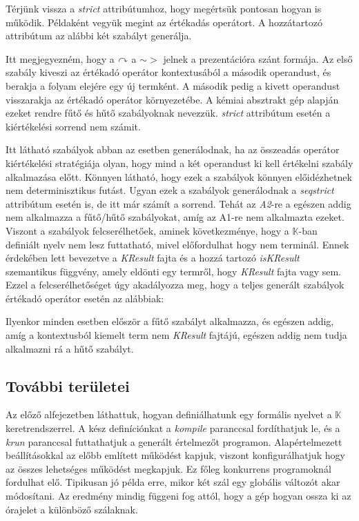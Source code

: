Térjünk vissza a \textit{strict} attribútumhoz, hogy megértsük pontosan hogyan is működik. Példaként vegyük megint az értékadás operátort. A hozzátartozó attribútum az alábbi két szabályt generálja.



Itt megjegyezném, hogy a $\curvearrowright$ a $\sim>$ jelnek a prezentációra szánt formája. Az első szabály kiveszi az értékadó operátor kontextusából a második operandust, és berakja a folyam elejére egy új termként. A második pedig a kivett operandust visszarakja az értékadó operátor környezetébe. A kémiai absztrakt gép alapján ezeket rendre fűtő és hűtő szabályoknak nevezzük. \textit{strict} attribútum esetén a kiértékelési sorrend nem számit.




Itt látható szabályok abban az esetben generálodnak, ha az összeadás operátor kiértékelési stratégiája olyan, hogy mind a két operandust ki kell értékelni szabály alkalmazása előtt. Könnyen látható, hogy ezek a szabályok könnyen előidézhetnek nem determinisztikus futást. Ugyan ezek a szabályok generálodnak a \textit{seqstrict} attribútum esetén is, de itt már számít a sorrend. Tehát az \textit{A2}-re a egészen addig nem alkalmazza a fűtő/hűtő szabályokat, amíg az A1-re nem alkalmazta ezeket. Viszont a szabályok felcserélhetőek, aminek következménye, hogy a $\mathbb{K}$-ban definiált nyelv nem lesz futtatható, mivel előfordulhat hogy nem terminál. Ennek érdekében lett bevezetve a \textit{KResult} fajta és a hozzá tartozó \textit{isKResult} szemantikus függvény, amely eldönti egy termről, hogy \textit{KResult} fajta vagy sem. Ezzel a felcserélhetőséget úgy akadályozza meg, hogy a teljes generált szabályok értékadó operátor esetén az alábbiak:



Ilyenkor minden esetben először a fűtő szabályt alkalmazza, és egészen addig, amíg a kontextusból kiemelt term nem \textit{KResult} fajtájú, egészen addig nem tudja alkalmazni rá a hűtő szabályt.

\subsection{További területei}

Az előző alfejezetben láthattuk, hogyan definiálhatunk egy formális nyelvet a $\mathbb{K}$ keretrendszerrel. A kész definíciónkat a \textit{kompile} paranccsal fordíthatjuk le, és a \textit{krun} paranccsal futtathatjuk a generált értelmezőt programon. Alapértelmezett beállításokkal az előbb említett működést kapjuk, viszont konfigurálhatjuk hogy az összes lehetséges működést megkapjuk. Ez főleg konkurrens programoknál fordulhat elő. Tipikusan jó példa erre, mikor két szál egy globális változót akar módosítani. Az eredmény mindig függeni fog attól, hogy a gép hogyan ossza ki az órajelet a különböző szálaknak.

